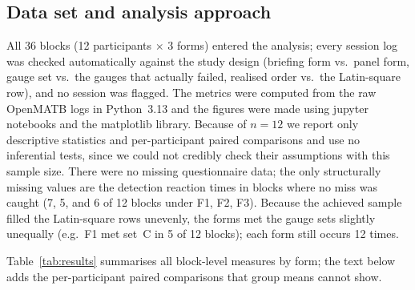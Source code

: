 \documentclass[10pt,twocolumn]{article}
\begin{document}
\subsection{Data set and analysis approach}
All 36 blocks (12 participants $\times$ 3 forms) entered the analysis; every session log was checked automatically against the study design (briefing form vs.\ panel form, gauge set vs.\ the gauges that actually failed, realised order vs.\ the Latin-square row), and no session was flagged. The metrics were computed from the raw OpenMATB logs in Python~3.13 and the figures were made using jupyter notebooks and the matplotlib library. Because of $n = 12$ we report only descriptive statistics and per-participant paired comparisons and use no inferential tests, since we could not credibly check their assumptions with this sample size. There were no missing questionnaire data; the only structurally missing values are the detection reaction times in blocks where no miss was caught (7, 5, and 6 of 12 blocks under F1, F2, F3). Because the achieved sample filled the Latin-square rows unevenly, the forms met the gauge sets slightly unequally (e.g.\ F1 met set~C in 5 of 12 blocks); each form still occurs 12 times.

Table~\ref{tab:results} summarises all block-level measures by form; the text below adds the per-participant paired comparisons that group means cannot show.
\end{document}
